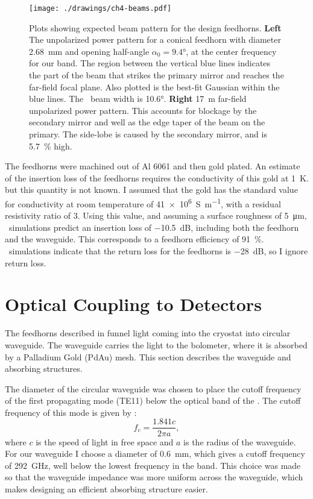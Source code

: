 \begin{figure}
\centering
\texttt{[image: ./drawings/ch4-beams.pdf]}
\caption[Beam patterns]{
  Plots showing expected beam pattern for the design feedhorns.
  \textbf{Left} The unpolarized power pattern for a conical feedhorn with diameter \SI{2.68}{\mm} and opening half-angle $\alpha_0 = \ang{9.4}$, at the center frequency for our band.
  The region between the vertical blue lines indicates the part of the beam that strikes the primary mirror and reaches the far-field focal plane.
  Also plotted is the best-fit Gaussian within the blue lines.
  The \FWHM\ beam width is \ang{10.6}.
  \textbf{Right} \SI{17}{\m} far-field unpolarized power pattern.
  This accounts for blockage by the secondary mirror and well as the edge taper of the beam on the primary.
  The side-lobe is caused by the secondary mirror, and is \SI{5.7}{\percent} high.
}
\label{fig:ch4-beams}
\end{figure}

The feedhorns were machined out of Al 6061 and then gold plated.
An estimate of the insertion loss of the feedhorns requires the conductivity of this gold at \SI{1}{\K}. but this quantity is not known.
I assumed that the gold has the standard value for conductivity at room temperature of \SI{41e6}{S\per\m}, with a residual resistivity ratio of 3.
Using this value, and assuming a surface roughness of \SI{5}{\um}, \HFSS\ simulations predict an insertion loss of \SI{-10.5}{\dB}, including both the feedhorn and the waveguide.
This corresponds to a feedhorn efficiency of \SI{91}{\percent}.
\HFSS\ simulations indicate that the return loss for the feedhorns is \SI{-28}{\dB}, so I ignore return loss.

\section{Optical Coupling to Detectors} \label{sec:ch4-coupling}

The feedhorns described in  funnel light coming into the cryostat into circular waveguide.
The waveguide carries the light to the bolometer, where it is absorbed by a Palladium Gold (PdAu) mesh.
This section describes the waveguide and absorbing structures.

The diameter of the circular waveguide was chosen to place the cutoff frequency of the first propagating mode (TE11) below the optical band of the \Imager.
The cutoff frequency of this mode is given by \cite[Chapter~5]{harrington_time-harmonic_2001}:
\begin{equation} \label{eqn:ch4-te11-cutoff}
  f_c = \frac{1.841 c}{2 \pi a },
\end{equation}
where $c$ is the speed of light in free space and $a$ is the radius of the waveguide.
For our waveguide I choose a diameter of \SI{0.6}{\mm}, which gives a cutoff frequency of \SI{292}{\GHz}, well below the lowest frequency in the band.
This choice was made so that the waveguide impedance was more uniform across the waveguide, which makes designing an efficient absorbing structure easier.

